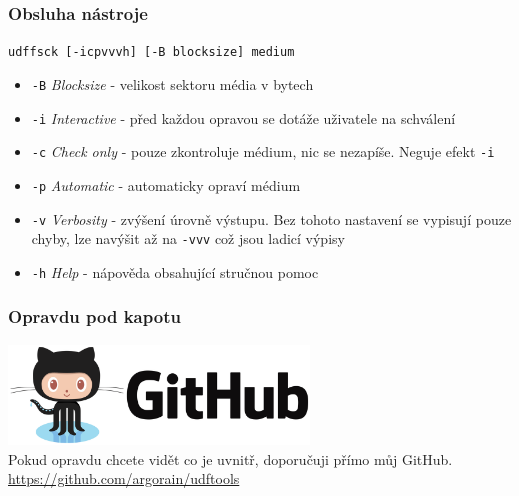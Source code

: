 \documentclass[aspectratio=169]{beamer}
\begin{document}
        \begin{frame}
            \frametitle{Obsluha nástroje}
            \vspace{40pt}
            \center
            \Large{\texttt{udffsck [-icpvvvh] [-B blocksize] medium}}
            \vspace{20pt}
            \begin{itemize}
                \item\texttt{-B} \textit{Blocksize} - velikost sektoru média v bytech
                \item\texttt{-i} \textit{Interactive} - před každou opravou se dotáže uživatele na schválení
                \item\texttt{-c} \textit{Check only} - pouze zkontroluje médium, nic se nezapíše. Neguje efekt \texttt{-i}
                \item\texttt{-p} \textit{Automatic} - automaticky opraví médium
                \item\texttt{-v} \textit{Verbosity} - zvýšení úrovně výstupu. Bez tohoto nastavení se vypisují pouze chyby, lze navýšit až na \texttt{-vvv} což jsou ladicí výpisy
                \item\texttt{-h} \textit{Help} - nápověda obsahující stručnou pomoc
            \end{itemize}
        \end{frame}

        \begin{frame}
            \frametitle{Opravdu pod kapotu}
            \vspace{40pt}
            \center
			\includegraphics[width=8cm]{github-logo.png}\\
            \LARGE{Pokud opravdu chcete vidět co je uvnitř, doporučuji přímo můj GitHub.}\\
            \vspace{20pt}
            \Large{\url{https://github.com/argorain/udftools}}
        \end{frame}
\end{document}
